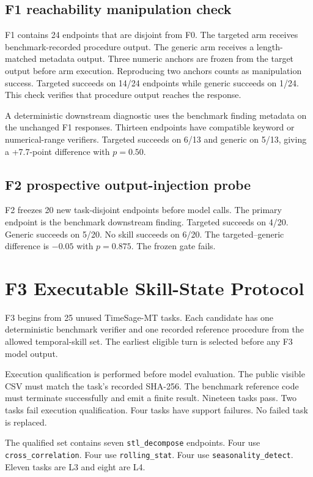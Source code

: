 \subsection{F1 reachability manipulation check}
F1 contains 24 endpoints that are disjoint from F0. The targeted arm receives benchmark-recorded procedure output. The generic arm receives a length-matched metadata output. Three numeric anchors are frozen from the target output before arm execution. Reproducing two anchors counts as manipulation success. Targeted succeeds on 14/24 endpoints while generic succeeds on 1/24. This check verifies that procedure output reaches the response.

A deterministic downstream diagnostic uses the benchmark finding metadata on the unchanged F1 responses. Thirteen endpoints have compatible keyword or numerical-range verifiers. Targeted succeeds on 6/13 and generic on 5/13, giving a +7.7-point difference with $p=0.50$.

\subsection{F2 prospective output-injection probe}
F2 freezes 20 new task-disjoint endpoints before model calls. The primary endpoint is the benchmark downstream finding. Targeted succeeds on 4/20. Generic succeeds on 5/20. No skill succeeds on 6/20. The targeted--generic difference is $-0.05$ with $p=0.875$. The frozen gate fails.

\section{F3 Executable Skill-State Protocol}
\label{app:f3}
F3 begins from 25 unused TimeSage-MT tasks. Each candidate has one deterministic benchmark verifier and one recorded reference procedure from the allowed temporal-skill set. The earliest eligible turn is selected before any F3 model output.

Execution qualification is performed before model evaluation. The public visible CSV must match the task's recorded SHA-256. The benchmark reference code must terminate successfully and emit a finite result. Nineteen tasks pass. Two tasks fail execution qualification. Four tasks have support failures. No failed task is replaced.

The qualified set contains seven \texttt{stl\_decompose} endpoints. Four use \texttt{cross\_correlation}. Four use \texttt{rolling\_stat}. Four use \texttt{seasonality\_detect}. Eleven tasks are L3 and eight are L4.

